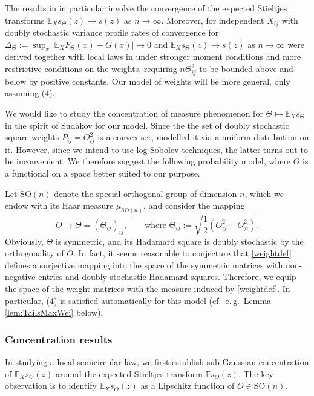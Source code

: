 \documentclass[a4paper,12pt]{amsart}
\numberwithin{equation}{section}
\theoremstyle{remark}
\def\E{{\mathbb E}}
\begin{document}
The results in \cite{GNT15} in particular involve the convergence of the expected Stieltjes transforms $\E_X s_\Theta(z) \to s(z)$ as $n \to \infty$. Moreover, for independent $X_{ij}$ with doubly stochastic variance profile rates of convergence for $\Delta_\Theta :=\sup_x| \E_XF_\Theta(x) - G(x)| \to 0$ and $\E_X s_\Theta(z) \to s(z)$ as $n \to \infty$ were derived together with local laws in \cite{EYY12} under stronger moment conditions and more restrictive conditions on the weights, requiring $n\Theta_{ij}^2$ to be bounded above and below by positive constants. Our model of weights will be more general, only assuming (4).

We would like to study the concentration of measure phenomenon for $\Theta \mapsto \E_X s_\Theta$ in the spirit of Sudakov for our model. Since the the set of doubly stochastic square weights $P_{ij}=\Theta_{ij}^2$ is a convex set, \cite{CDS10} modelled it via a uniform distribution on it. However, since we intend to use log-Sobolev techniques, the latter turns out to be inconvenient. We therefore suggest the following probability model, where $\Theta$ is a functional on a space better suited to our purpose.

Let $\mathrm{SO}(n)$ denote the special orthogonal group of dimension $n$, which we endow with its Haar measure $\mu_{\mathrm{SO}(n)}$, and consider the mapping
\begin{equation}
O \mapsto \Theta = (\Theta_{ij})_{ij},\qquad \text{where } \Theta_{ij} := \sqrt{ \frac 1 2 (O_{ij}^2 + O_{ji}^2)}. \label{weightdef}
\end{equation}
Obviously, $\Theta$ is symmetric, and its Hadamard square is doubly stochastic by the orthogonality of $O$. In fact, it seems reasonable to conjecture that \eqref{weightdef} defines a surjective mapping into the space of the symmetric matrices with non-negative entries and doubly stochastic Hadamard squares. Therefore, we equip the space of the weight matrices with the measure induced by \eqref{weightdef}. In particular, (4) is satisfied automatically for this model (cf.\ e.\,g.\ Lemma \ref{lem:TailsMaxWei} below).

\subsubsection{Concentration results}
In studying a local semicircular law, we first establish sub-Gaussian concentration of $\E_X s_\Theta(z)$ around the expected Stieltjes transform $\E s_\Theta(z)$. The key observation is to identify $\E_X s_\Theta(z)$ as a Lipschitz function of $O \in \mathrm{SO}(n)$.
\end{document}
